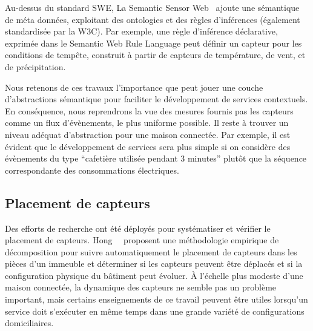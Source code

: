 Au-dessus du standard SWE, La Semantic Sensor Web~\parencite{sheth2008semantic} ajoute une 
sémantique de méta données, exploitant des ontologies et des règles d'inférences 
(également standardisée par la W3C). Par exemple, une règle d'inférence 
déclarative, exprimée dans le Semantic Web Rule Language peut définir un 
capteur pour les conditions de tempête, construit à partir de capteurs 
de température, de vent, et de précipitation.

Nous retenons de ces travaux l'importance que peut jouer une couche d'abstractions sémantique
pour faciliter le développement de services contextuels. En conséquence, nous reprendrons la
vue des mesures fournis pas les capteurs comme un flux d'évènements, le plus uniforme possible.
Il reste à trouver un niveau adéquat d'abstraction pour une maison connectée. Par exemple, il est évident que le développement
de services sera plus simple si on considère des évènements du type ``cafetière utilisée pendant 3 minutes'' plutôt que la
séquence correspondante des consommations électriques.

\subsection{Placement de capteurs}
Des efforts de recherche ont été déployés pour systématiser et vérifier le placement
de capteurs. Hong~\etal~\parencite{hong2013toward} proposent une
méthodologie empirique de décomposition pour suivre automatiquement le
placement de capteurs dans les pièces d'un immeuble et déterminer si
les capteurs peuvent être déplacés et si la configuration physique du
bâtiment peut évoluer. 
À l'échelle plus modeste d'une maison connectée, 
la dynamique des capteurs ne semble pas
un problème important, 
mais certains enseignements de ce travail peuvent être utiles lorsqu'un
service doit s'exécuter en même temps dans une grande variété de configurations domiciliaires.

